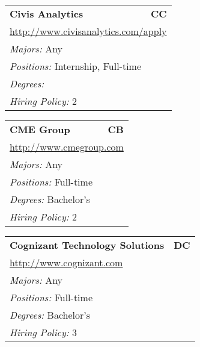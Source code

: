 \documentclass[twoside]{article}
\begin{document}
\begin{center}
\begin{multicols}{3}
\begin{FlushLeft}
\begin{minipage}{.9\columnwidth}
\end{minipage}
 
\begin{minipage}{.9\columnwidth}\begin{tabularx}{.95\columnwidth}{Xr}
                 {\Large\bf Civis Analytics} & {\Large\bf CC}\\
    \multicolumn{2}{p{.95\columnwidth}}{\url{http://www.civisanalytics.com/apply}}\\
    \multicolumn{2}{p{.95\columnwidth}}{\emph{Majors:} Any}\\
    \multicolumn{2}{p{.95\columnwidth}}{\emph{Positions:} Internship, Full-time}\\
    \multicolumn{2}{p{.95\columnwidth}}{\emph{Degrees:} }\\
    \multicolumn{2}{p{.95\columnwidth}}{\emph{Hiring Policy:} 2}\\
    \end{tabularx}
    
\end{minipage}
 
\begin{minipage}{.9\columnwidth}\begin{tabularx}{.95\columnwidth}{Xr}
                 {\Large\bf CME Group} & {\Large\bf CB}\\
    \multicolumn{2}{p{.95\columnwidth}}{\url{http://www.cmegroup.com}}\\
    \multicolumn{2}{p{.95\columnwidth}}{\emph{Majors:} Any}\\
    \multicolumn{2}{p{.95\columnwidth}}{\emph{Positions:} Full-time}\\
    \multicolumn{2}{p{.95\columnwidth}}{\emph{Degrees:} Bachelor's}\\
    \multicolumn{2}{p{.95\columnwidth}}{\emph{Hiring Policy:} 2}\\
    \end{tabularx}
    
\end{minipage}
 
\begin{minipage}{.9\columnwidth}\begin{tabularx}{.95\columnwidth}{Xr}
                 {\Large\bf Cognizant Technology Solutions} & {\Large\bf DC}\\
    \multicolumn{2}{p{.95\columnwidth}}{\url{http://www.cognizant.com}}\\
    \multicolumn{2}{p{.95\columnwidth}}{\emph{Majors:} Any}\\
    \multicolumn{2}{p{.95\columnwidth}}{\emph{Positions:} Full-time}\\
    \multicolumn{2}{p{.95\columnwidth}}{\emph{Degrees:} Bachelor's}\\
    \multicolumn{2}{p{.95\columnwidth}}{\emph{Hiring Policy:} 3}\\
    \end{tabularx}
    

\end{minipage}
\end{FlushLeft}
\end{multicols}
\end{center}
\end{document}
